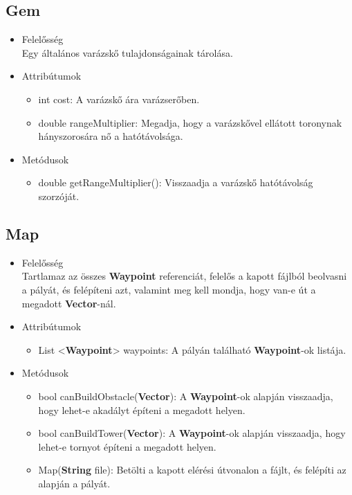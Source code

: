 \subsection{Gem}
\begin{itemize}
\item Felelősség\\
Egy általános varázskő tulajdonságainak tárolása.
\item Attribútumok
	\begin{itemize}
		\item int cost: A varázskő ára varázserőben.
		\item double rangeMultiplier: Megadja, hogy a varázskővel ellátott toronynak hányszorosára nő a hatótávolsága.
	\end{itemize}
\item Metódusok
	\begin{itemize}
		\item double getRangeMultiplier(): Visszaadja a varázskő hatótávolság szorzóját.
	\end{itemize}
\end{itemize}


\subsection{Map}
\begin{itemize}
\item Felelősség\\
Tartlamaz az összes \textbf{Waypoint} referenciát, felelős a kapott fájlból beolvasni a pályát, és felépíteni azt, valamint meg kell mondja, hogy van-e út a megadott \textbf{Vector}-nál.
\item Attribútumok
	\begin{itemize}
		\item List <\textbf{Waypoint}> waypoints: A pályán található \textbf{Waypoint}-ok listája.
	\end{itemize}
\item Metódusok
	\begin{itemize}
		\item bool canBuildObstacle(\textbf{Vector}): A \textbf{Waypoint}-ok alapján visszaadja, hogy lehet-e akadályt építeni a megadott helyen.
		\item bool canBuildTower(\textbf{Vector}): A \textbf{Waypoint}-ok alapján visszaadja, hogy lehet-e tornyot építeni a megadott helyen.
		\item Map(\textbf{String} file): Betölti a kapott elérési útvonalon a fájlt, és felépíti az alapján a pályát.
	\end{itemize}
\end{itemize}


